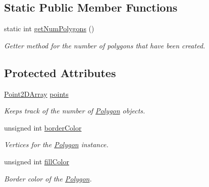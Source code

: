 \subsection*{Static Public Member Functions}
\begin{DoxyCompactItemize}
\item 
\hypertarget{class_polygon_a1767ac5482d2bd85e8826aacf7214ee5}{static int \hyperlink{class_polygon_a1767ac5482d2bd85e8826aacf7214ee5}{get\+Num\+Polygons} ()}\label{class_polygon_a1767ac5482d2bd85e8826aacf7214ee5}

\begin{DoxyCompactList}\small\item\em Getter method for the number of polygons that have been created. \end{DoxyCompactList}\end{DoxyCompactItemize}
\subsection*{Protected Attributes}
\begin{DoxyCompactItemize}
\item 
\hypertarget{class_polygon_a3f17a85c09bd04138f22ae31d18b6b4d}{\hyperlink{class_point2_d_array}{Point2\+D\+Array} \hyperlink{class_polygon_a3f17a85c09bd04138f22ae31d18b6b4d}{points}}\label{class_polygon_a3f17a85c09bd04138f22ae31d18b6b4d}

\begin{DoxyCompactList}\small\item\em Keeps track of the number of \hyperlink{class_polygon}{Polygon} objects. \end{DoxyCompactList}\item 
\hypertarget{class_polygon_ac7e55927e6dda8a8ef0a9bf937564015}{unsigned int \hyperlink{class_polygon_ac7e55927e6dda8a8ef0a9bf937564015}{border\+Color}}\label{class_polygon_ac7e55927e6dda8a8ef0a9bf937564015}

\begin{DoxyCompactList}\small\item\em Vertices for the \hyperlink{class_polygon}{Polygon} instance. \end{DoxyCompactList}\item 
\hypertarget{class_polygon_a8785a91a1462e4fd02cff574e51f3948}{unsigned int \hyperlink{class_polygon_a8785a91a1462e4fd02cff574e51f3948}{fill\+Color}}\label{class_polygon_a8785a91a1462e4fd02cff574e51f3948}

\begin{DoxyCompactList}\small\item\em Border color of the \hyperlink{class_polygon}{Polygon}. \end{DoxyCompactList}\end{DoxyCompactItemize}
